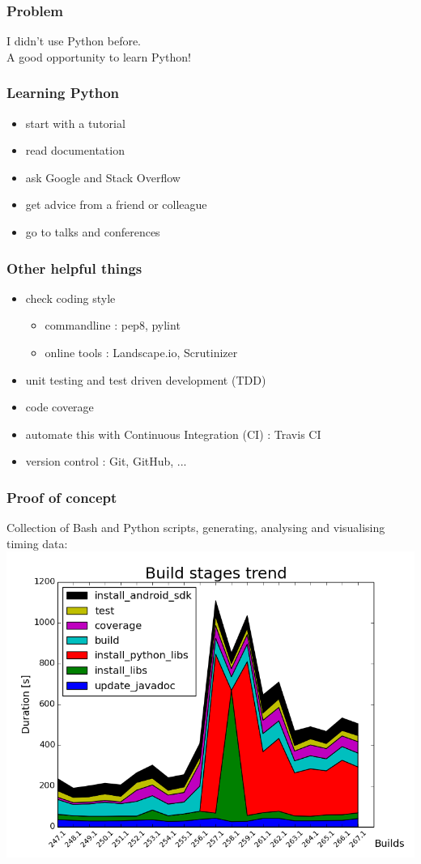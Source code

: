 \documentclass[14pt]{beamer}
\begin{document}
  \begin{frame}
    \frametitle{Problem}
    I didn't use Python before.\\
    \pause
    A good opportunity to learn Python!
  \end{frame}
  \begin{frame}
    \frametitle{Learning Python}
    \begin{itemize}
      \item start with a tutorial
      \item read documentation
      \item ask Google and Stack Overflow
      \item get advice from a friend or colleague
      \item go to talks and conferences
    \end{itemize}
  \end{frame}
  \begin{frame}
    \frametitle{Other helpful things}
    \begin{itemize}
      \item check coding style
        \begin{itemize}
          \item commandline : pep8, pylint
          \item online tools : Landscape.io, Scrutinizer
        \end{itemize}
      \item unit testing and test driven development (TDD)
      \item code coverage
      \item automate this with Continuous Integration (CI) : Travis CI
      \item version control : Git, GitHub, ...
    \end{itemize}
  \end{frame}
  \begin{frame}
    \frametitle{Proof of concept}
    Collection of Bash and Python scripts, generating, analysing and visualising timing data:
    \includegraphics[scale=.45]{example_matplotlib_trend.png}
  \end{frame}
\end{document}
